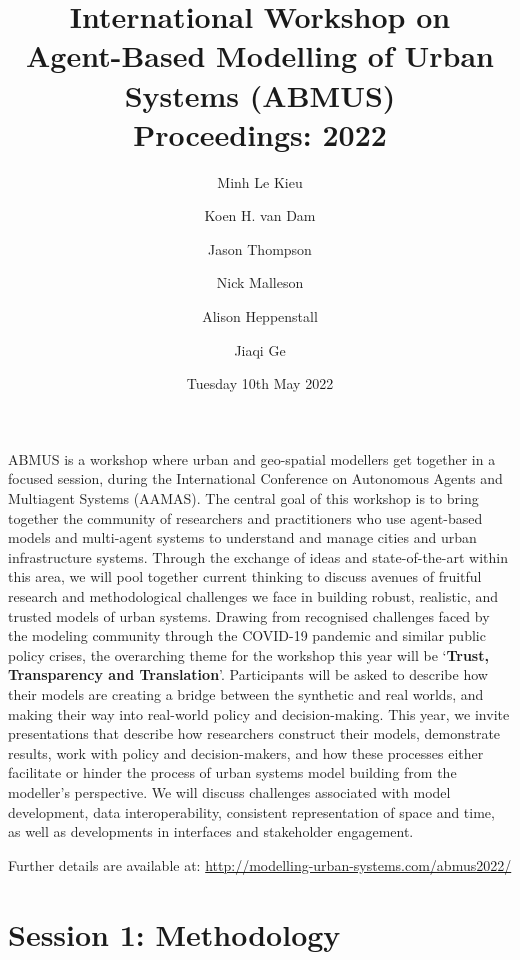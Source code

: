 \documentclass[a4paper,11pt]{article}
\begin{document}
\author{Minh Le Kieu \and Koen H. van Dam\and Jason Thompson \and Nick Malleson \and Alison Heppenstall \and Jiaqi Ge}
\title{International Workshop on \\ Agent-Based Modelling of Urban Systems (ABMUS) \\ Proceedings: 2022}
\date{Tuesday 10th May 2022}

\maketitle

ABMUS is a workshop where urban and geo-spatial modellers get together in a focused session, during the International Conference on Autonomous Agents and Multiagent Systems (AAMAS). The central goal of this workshop is to bring together the community of researchers and practitioners who use agent-based models and multi-agent systems to understand and manage cities and urban infrastructure systems. Through the exchange of ideas and state-of-the-art within this area, we will pool together current thinking to discuss avenues of fruitful research and methodological challenges we face in building robust, realistic, and trusted models of urban systems. Drawing from recognised challenges faced by the modeling community through the COVID-19 pandemic and similar public policy crises, the overarching theme for the workshop this year will be ‘\textbf{Trust, Transparency and Translation}’. Participants will be asked to describe how their models are creating a bridge between the synthetic and real worlds, and making their way into real-world policy and decision-making. This year, we invite presentations that describe how researchers construct their models, demonstrate results, work with policy and decision-makers, and how these processes either facilitate or hinder the process of urban systems model building from the modeller's perspective. We will discuss challenges associated with model development, data interoperability, consistent representation of space and time, as well as developments in interfaces and stakeholder engagement.

Further details are available at: \url{http://modelling-urban-systems.com/abmus2022/}

\newpage
\tableofcontents

\newpage

\section{Session 1: Methodology}
\end{document}
